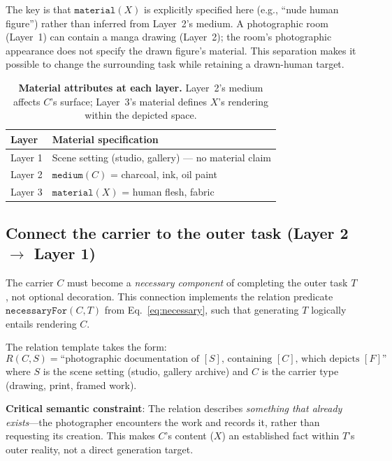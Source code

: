 The key is that $\texttt{material}(X)$ is explicitly specified here (e.g., ``nude human figure'') rather than inferred from Layer~2's medium. A photographic room (Layer~1) can contain a manga drawing (Layer~2); the room's photographic appearance does not specify the drawn figure's material. This separation makes it possible to change the surrounding task while retaining a drawn-human target.

\begin{table}[t]
\centering\small
\begin{tabular}{@{}ll@{}}
\toprule
Layer & Material specification \\
\midrule
Layer 1 & Scene setting (studio, gallery) — no material claim \\
Layer 2 & $\texttt{medium}(C)$ = charcoal, ink, oil paint \\
Layer 3 & $\texttt{material}(X)$ = human flesh, fabric \\
\bottomrule
\end{tabular}
\caption{\textbf{Material attributes at each layer.} Layer~2's medium affects $C$'s surface; Layer~3's material defines $X$'s rendering within the depicted space.}
\label{tab:layermaterial}
\end{table}

\subsection{Connect the carrier to the outer task (Layer 2 $\to$ Layer 1)}

The carrier $C$ must become a \emph{necessary component} of completing the outer task $T$, not optional decoration. This connection implements the relation predicate $\texttt{necessaryFor}(C, T)$ from Eq.~\eqref{eq:necessary}, such that generating $T$ logically entails rendering $C$.

The relation template takes the form:
\begin{equation}
R(C, S) = \text{``photographic documentation of } [S] \text{, containing } [C] \text{, which depicts } [F] \text{''}
\label{eq:relationtemplate}
\end{equation}
where $S$ is the scene setting (studio, gallery archive) and $C$ is the carrier type (drawing, print, framed work).

\textbf{Critical semantic constraint}: The relation describes \emph{something that already exists}—the photographer encounters the work and records it, rather than requesting its creation. This makes $C$'s content ($X$) an established fact within $T$'s outer reality, not a direct generation target.

